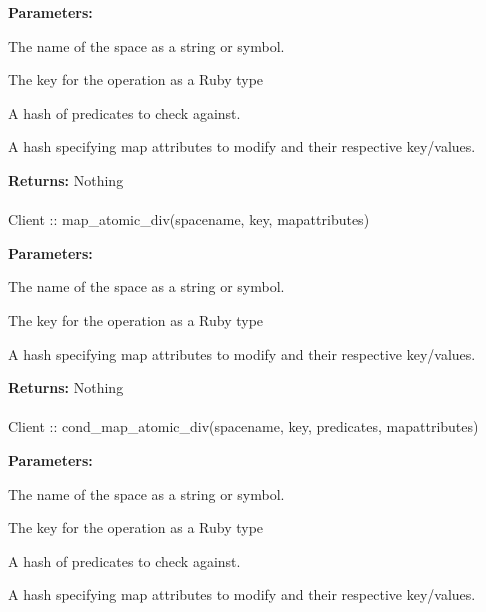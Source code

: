 \noindent\textbf{Parameters:}
\begin{description}[labelindent=\widthof{{mapattributes}},leftmargin=*,noitemsep,nolistsep,align=right]
\item[spacename] The name of the space as a string or symbol.
\item[key] The key for the operation as a Ruby type
\item[predicates] A hash of predicates to check against.
\item[mapattributes] A hash specifying map attributes to modify and their respective key/values.
\end{description}

\noindent\textbf{Returns:}
Nothing

\paragraph{}
\begin{ccode}
Client :: map_atomic_div(spacename, key, mapattributes)
\end{ccode}
\funcdesc 

\noindent\textbf{Parameters:}
\begin{description}[labelindent=\widthof{{mapattributes}},leftmargin=*,noitemsep,nolistsep,align=right]
\item[spacename] The name of the space as a string or symbol.
\item[key] The key for the operation as a Ruby type
\item[mapattributes] A hash specifying map attributes to modify and their respective key/values.
\end{description}

\noindent\textbf{Returns:}
Nothing

\paragraph{}
\begin{ccode}
Client :: cond_map_atomic_div(spacename, key, predicates, mapattributes)
\end{ccode}
\funcdesc 

\noindent\textbf{Parameters:}
\begin{description}[labelindent=\widthof{{mapattributes}},leftmargin=*,noitemsep,nolistsep,align=right]
\item[spacename] The name of the space as a string or symbol.
\item[key] The key for the operation as a Ruby type
\item[predicates] A hash of predicates to check against.
\item[mapattributes] A hash specifying map attributes to modify and their respective key/values.
\end{description}


